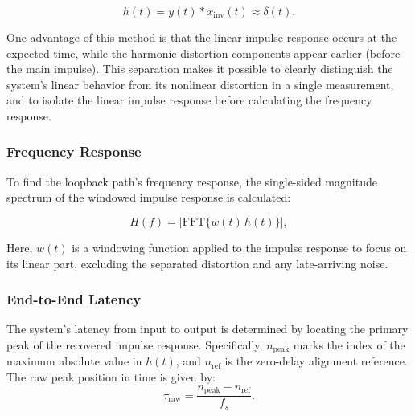 \begin{equation}
h(t) = y(t) * x_{\mathrm{inv}}(t) \approx \delta(t).
\label{eq:deconv}
\end{equation}

One advantage of this method is that the linear impulse response occurs at the expected time, while the harmonic distortion components appear earlier (before the main impulse). This separation makes it possible to clearly distinguish the system’s linear behavior from its nonlinear distortion in a single measurement, and to isolate the linear impulse response before calculating the frequency response.

\subsubsection{Frequency Response}
\label{sec:char_fr}

To find the loopback path’s frequency response, the single-sided magnitude spectrum of the windowed impulse response is calculated:

\begin{equation}
H(f) = \left| \mathrm{FFT}\{ w(t)\, h(t) \} \right|,
\label{eq:fr}
\end{equation}

Here, $w(t)$ is a windowing function applied to the impulse response to focus on its linear part, excluding the separated distortion and any late-arriving noise.
\subsubsection{End-to-End Latency}
\label{sec:char_latency}

The system's latency from input to output is determined by locating the primary peak of the recovered impulse response. Specifically, $n_{\text{peak}}$ marks the index of the maximum absolute value in $h(t)$, and $n_{\text{ref}}$ is the zero-delay alignment reference. The raw peak position in time is given by:
\begin{equation}
\tau_{\text{raw}} = \frac{n_{\text{peak}} - n_{\text{ref}}}{f_s}.
\label{eq:latency}
\end{equation}

